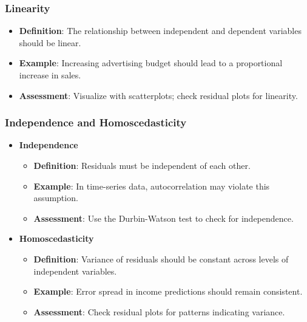 \documentclass{beamer}
\begin{document}
\begin{frame}[fragile]
    \frametitle{Linearity}
    
    \begin{itemize}
        \item \textbf{Definition}: The relationship between independent and dependent variables should be linear.
        \item \textbf{Example}: Increasing advertising budget should lead to a proportional increase in sales.
        \item \textbf{Assessment}: Visualize with scatterplots; check residual plots for linearity.
    \end{itemize}
\end{frame}

\begin{frame}[fragile]
    \frametitle{Independence and Homoscedasticity}
    
    \begin{itemize}
        \item \textbf{Independence}
        \begin{itemize}
            \item \textbf{Definition}: Residuals must be independent of each other.
            \item \textbf{Example}: In time-series data, autocorrelation may violate this assumption.
            \item \textbf{Assessment}: Use the Durbin-Watson test to check for independence.
        \end{itemize}
        
        \item \textbf{Homoscedasticity}
        \begin{itemize}
            \item \textbf{Definition}: Variance of residuals should be constant across levels of independent variables.
            \item \textbf{Example}: Error spread in income predictions should remain consistent.
            \item \textbf{Assessment}: Check residual plots for patterns indicating variance.
        \end{itemize}
    \end{itemize}
\end{frame}
\end{document}
